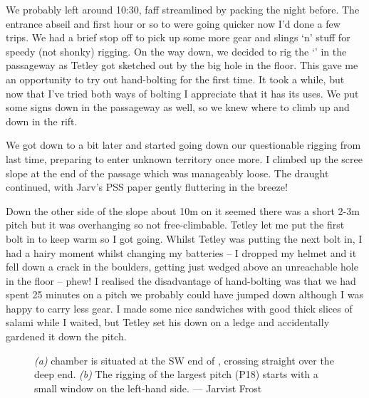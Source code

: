 We probably left around 10:30, faff streamlined by packing the night before. The entrance abseil and first hour or so to  were going quicker now I’d done a few trips. We had a brief stop off to pick up some more gear and slings ‘n’ stuff for speedy (not shonky) rigging. On the way down, we decided to rig the ‘’ in the  passageway as Tetley got sketched out by the big hole in the floor. This gave me an opportunity to try out hand-bolting for the first time. It took a while, but now that I’ve tried both ways of bolting I appreciate that it has its uses. We put some signs down in the  passageway as well, so we knew where to climb up and down in the rift.

We got down to  a bit later and started going down our questionable rigging from last time, preparing to enter unknown territory once more. I climbed up the scree slope at the end of the passage which was manageably loose. The draught continued, with Jarv’s PSS paper gently fluttering in the breeze! 

Down the other side of the slope about 10m on it seemed there was a short 2-3m pitch but it was overhanging so not free-climbable. Tetley let me put the first bolt in to keep warm so I got going. Whilst Tetley was putting the next bolt in, I had a hairy moment whilst changing my batteries – I dropped my helmet and it fell down a crack in the boulders, getting just wedged above an unreachable hole in the floor – phew! I realised the disadvantage of hand-bolting was that we had spent 25 minutes on a pitch we probably could have jumped down although I was happy to carry less gear. I made some nice sandwiches with good thick slices of salami while I waited, but Tetley set his down on a ledge and accidentally gardened it down the pitch. 

\begin{figure*}[t!]
	\checkoddpage \ifoddpage \forcerectofloat \else \forceversofloat \fi
	\centering
	\begin{subfigure}[t]{0.6337\textwidth}
		\centering
		 \caption{}\label{hammerhead passage}
	\end{subfigure}
  	 \hfill
   	 \begin{subfigure}[t]{0.3563\textwidth}
        		\centering
        		\caption{} \label{hammerhead pitch}
        \end{subfigure}
	\caption{
	 	  \textit{(a)} \protect{} chamber is situated at the SW end of \protect{}, crossing straight over the deep end.  
   		 \textit{(b)} The rigging of the largest \protect{} pitch (P18) starts with a small window on the left-hand side. --- Jarvist Frost}
\end{figure*}

